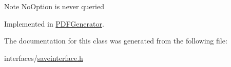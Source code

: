 \begin{DoxyNote}{Note}
No\+Option is never queried 
\end{DoxyNote}


Implemented in \hyperlink{classPDFGenerator_ad1da694c1f5836ac61c26ec50a80b2c8}{P\+D\+F\+Generator}.



The documentation for this class was generated from the following file\+:\begin{DoxyCompactItemize}
\item 
interfaces/\hyperlink{saveinterface_8h}{saveinterface.\+h}\end{DoxyCompactItemize}
